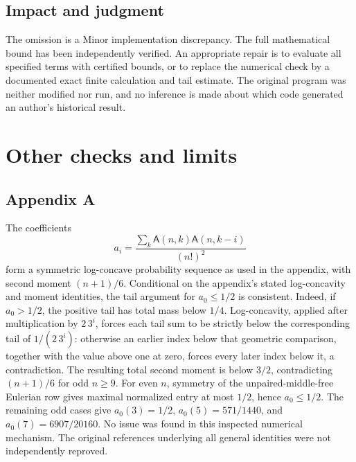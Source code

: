 \documentclass[10pt]{article}
\begin{document}
\subsection*{Impact and judgment}
The omission is a Minor implementation discrepancy. The full mathematical bound has been independently verified. An appropriate repair is to evaluate all specified terms with certified bounds, or to replace the numerical check by a documented exact finite calculation and tail estimate. The original program was neither modified nor run, and no inference is made about which code generated an author’s historical result.\par
\section*{Other checks and limits}
\subsection*{Appendix A}
The coefficients \[a_i=\frac{\sum_k\mathsf A(n,k)\mathsf A(n,k-i)}{(n!)^2}\] form a symmetric log-concave probability sequence as used in the appendix, with second moment \((n+1)/6\). Conditional on the appendix’s stated log-concavity and moment identities, the tail argument for \(a_0\leq1/2\) is consistent. Indeed, if \(a_0>1/2\), the positive tail has total mass below \(1/4\). Log-concavity, applied after multiplication by \(2\,3^i\), forces each tail sum to be strictly below the corresponding tail of \(1/(2\,3^i)\): otherwise an earlier index below that geometric comparison, together with the value above one at zero, forces every later index below it, a contradiction. The resulting total second moment is below \(3/2\), contradicting \((n+1)/6\) for odd \(n\geq9\). For even \(n\), symmetry of the unpaired-middle-free Eulerian row gives maximal normalized entry at most \(1/2\), hence \(a_0\leq1/2\). The remaining odd cases give \(a_0(3)=1/2\), \(a_0(5)=571/1440\), and \(a_0(7)=6907/20160\). No issue was found in this inspected numerical mechanism. The original references underlying all general identities were not independently reproved.\par
\end{document}
